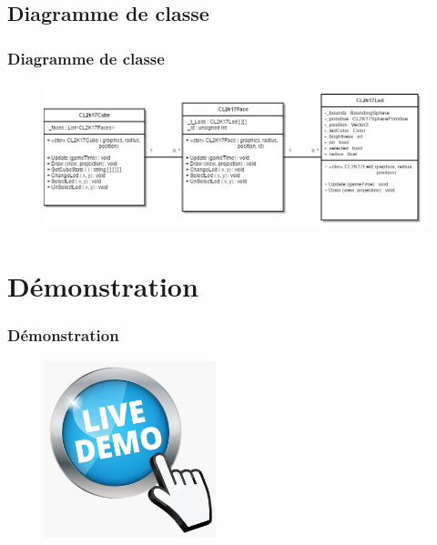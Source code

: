 \documentclass[aspectratio=169]{beamer} %
\begin{document}
	\subsection{Diagramme de classe}
	\begin{frame}
		\frametitle{Diagramme de classe}
		\begin{figure}[htp]
			\centering
			\includegraphics[width=14cm]{Img/DiagrammeUmlCube.png}
		\end{figure}
	\end{frame}

	
	
	\section{Démonstration}
	\begin{frame}
		\frametitle{Démonstration}
		\begin{figure}
			\centering
			\includegraphics[width=5cm]{Img/demo.jpg}
		\end{figure}
	\end{frame}
\end{document}

